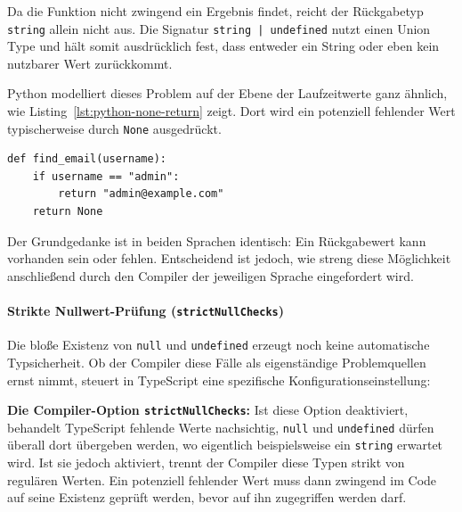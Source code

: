 Da die Funktion nicht zwingend ein Ergebnis findet, reicht der Rückgabetyp \texttt{string} allein nicht aus. Die Signatur \texttt{string | undefined} nutzt einen Union Type und hält somit ausdrücklich fest, dass entweder ein String oder eben kein nutzbarer Wert zurückkommt. 

Python modelliert dieses Problem auf der Ebene der Laufzeitwerte ganz ähnlich, wie Listing~\ref{lst:python-none-return} zeigt. Dort wird ein potenziell fehlender Wert typischerweise durch \texttt{None} ausgedrückt.

\begin{listing}[htbp]
    \caption{Möglicher fehlender Rückgabewert in Python}
    \label{lst:python-none-return}
    \begin{verbatim}
def find_email(username):
    if username == "admin":
        return "admin@example.com"
    return None
    \end{verbatim}
\end{listing}

Der Grundgedanke ist in beiden Sprachen identisch: Ein Rückgabewert kann vorhanden sein oder fehlen. Entscheidend ist jedoch, wie streng diese Möglichkeit anschließend durch den Compiler der jeweiligen Sprache eingefordert wird.

\paragraph{Strikte Nullwert-Prüfung (\texttt{strictNullChecks})}
\label{par:strict-null-checks}

Die bloße Existenz von \texttt{null} und \texttt{undefined} erzeugt noch keine automatische Typsicherheit. Ob der Compiler diese Fälle als eigenständige Problemquellen ernst nimmt, steuert in TypeScript eine spezifische Konfigurationseinstellung:

\begin{definition}
\label{def:ts-strict-null-checks}
\textbf{Die Compiler-Option \texttt{strictNullChecks}:} Ist diese Option deaktiviert, behandelt TypeScript fehlende Werte nachsichtig, \texttt{null} und \texttt{undefined} dürfen überall dort übergeben werden, wo eigentlich beispielsweise ein \texttt{string} erwartet wird. Ist sie jedoch aktiviert, trennt der Compiler diese Typen strikt von regulären Werten. Ein potenziell fehlender Wert muss dann zwingend im Code auf seine Existenz geprüft werden, bevor auf ihn zugegriffen werden darf.
\end{definition}

